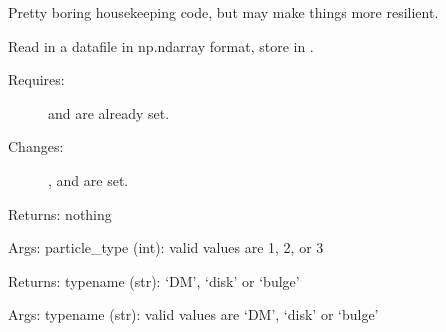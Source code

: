 \documentclass[letterpaper,10pt,english]{sphinxmanual}
\begin{document}
\begin{fulllineitems}
\begin{fulllineitems}
\begin{description}
\end{description}

Pretty boring housekeeping code, but may make things more resilient.

\end{fulllineitems}


\begin{fulllineitems}
\label{\detokenize{galaxy:galaxy.galaxy.Galaxy.read_file}}
Read in a datafile in np.ndarray format, store in .
\begin{description}
\item[{Requires:}] \leavevmode
{} and  are already set.

\item[{Changes:}] \leavevmode
{},  and  are set.

\end{description}

Returns: nothing

\end{fulllineitems}


\begin{fulllineitems}
\label{\detokenize{galaxy:galaxy.galaxy.Galaxy.type2name}}
Args: particle\_type (int): valid values are 1, 2, or 3

Returns: typename (str): ‘DM’, ‘disk’ or ‘bulge’

\end{fulllineitems}


\begin{fulllineitems}
\label{\detokenize{galaxy:galaxy.galaxy.Galaxy.name2type}}
Args: typename (str): valid values are ‘DM’, ‘disk’ or ‘bulge’


\end{fulllineitems}
\end{fulllineitems}
\end{document}
